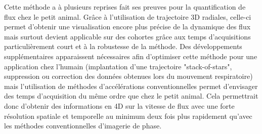 Cette méthode a à plusieurs reprises fait ses preuves pour la quantification de flux chez le petit animal. Grâce à l'utilisation de trajectoire 3D radiales, celle-ci permet d'obtenir une visualisation encore plus précise de la dynamique des flux mais surtout devient applicable sur des cohortes grâce aux temps d'acquisitions particulièrement court et à la robustesse de la méthode. Des développements supplémentaires apparaissent nécessaires afin d'optimiser cette méthode pour une application chez l'humain (implantation d'une trajectoire "stack-of-stars", suppression ou correction des données obtenues lors du mouvement respiratoire) mais l'utilisation de méthodes d'accélérations conventionnelles permet d'envisager des temps d'acquisition du même ordre que chez le petit animal. Cela permettrait donc d'obtenir des informations en 4D sur la vitesse de flux avec une forte résolution spatiale et temporelle au minimum deux fois plus rapidement qu'avec les méthodes conventionnelles d'imagerie de phase.

%